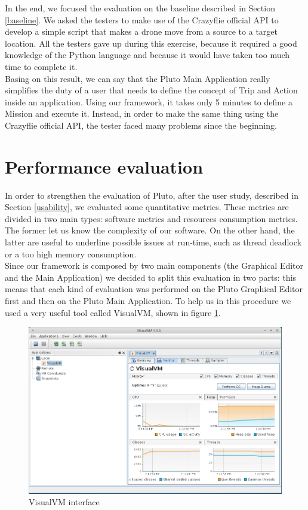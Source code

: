 In the end, we focused the evaluation on the baseline described in Section \ref{baseline}.
We asked the testers to make use of the Crazyflie official API to develop a simple script that makes a drone move from a source to a target location.
All the testers gave up during this exercise, because it required a good knowledge of the Python language and because it would have taken too much time to complete it.
\\
Basing on this result, we can say that the Pluto Main Application really simplifies the duty of a user that needs to define the concept of Trip and Action inside an application.
Using our framework, it takes only 5 minutes to define a Mission and execute it.
Instead, in order to make the same thing using the Crazyflie official API, the tester faced many problems since the beginning.
\\

\section{Performance evaluation}\label{performance}

In order to strengthen the evaluation of Pluto, after the user study, described in Section \ref{usability}, we evaluated some quantitative metrics. These metrics are divided in two main types: software metrics and resources consumption metrics. The former let us know the complexity of our software.
On the other hand, the latter are useful to underline possible issues at run-time, such as thread deadlock or a too high memory consumption.
\\

Since our framework is composed by two main components (the Graphical Editor and the Main Application) we decided to split this evaluation in two parts: this means that each kind of evaluation was performed on the Pluto Graphical Editor first and then on the Pluto Main Application.
To help us in this procedure we used a very useful tool called VisualVM, shown in figure \ref{fig:visualVM}. 

\begin{figure}[H]
  \centering
  \includegraphics[width=\linewidth]{pictures/visualVM.png}
  \caption{VisualVM interface}
  \label{fig:visualVM}
\end{figure}

